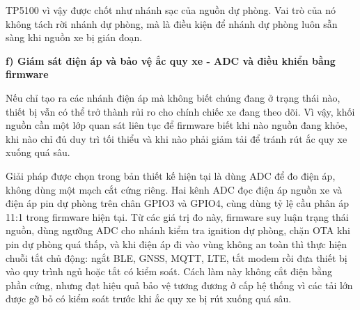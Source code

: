 \documentclass[a4paper]{extarticle}
\newcommand{\thesisterm}[1]{{\rmfamily #1}}
\begin{document}
TP5100 vì vậy được chốt như nhánh sạc của nguồn dự phòng. Vai trò của nó
không tách rời nhánh dự phòng, mà là điều kiện để nhánh dự phòng luôn sẵn sàng
khi nguồn xe bị gián đoạn.

\textbf{f) Giám sát điện áp và bảo vệ ắc quy xe - ADC và điều khiển bằng firmware}

Nếu chỉ tạo ra các nhánh điện áp mà không biết chúng đang ở trạng thái nào,
thiết bị vẫn có thể trở thành rủi ro cho chính chiếc xe đang theo dõi. Vì
vậy, khối nguồn cần một lớp quan sát liên tục để firmware biết khi nào nguồn
đang khỏe, khi nào chỉ đủ duy trì tối thiểu và khi nào phải giảm tải để tránh
rút ắc quy xe xuống quá sâu.

Giải pháp được chọn trong bản thiết kế hiện tại là dùng ADC để đo điện áp,
không dùng một mạch cắt cứng riêng. Hai kênh ADC đọc điện áp nguồn xe và điện áp pin
dự phòng trên chân \thesisterm{GPIO3} và \thesisterm{GPIO4}, cùng dùng tỷ lệ cầu phân áp 11:1 trong
firmware hiện tại. Từ các giá trị đo này, firmware suy luận trạng thái nguồn,
dùng ngưỡng ADC cho nhánh kiểm tra ignition dự phòng, chặn OTA khi pin dự phòng
quá thấp, và khi điện áp đi vào vùng không an toàn thì thực hiện chuỗi tắt
chủ động: ngắt BLE, GNSS, MQTT, LTE, tắt modem rồi đưa thiết bị vào quy trình
ngủ hoặc tắt có kiểm soát. Cách làm này không cắt điện bằng phần cứng, nhưng đạt hiệu
quả bảo vệ tương đương ở cấp hệ thống vì các tải lớn được gỡ bỏ có kiểm soát
trước khi ắc quy xe bị rút xuống quá sâu.
\end{document}

